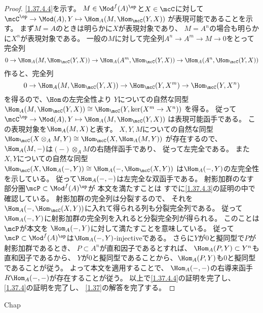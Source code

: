 \documentclass[uplatex,dvipdfmx]{jsarticle}
\begin{document}
\begin{proof}
  \ref{1.37.4.4}を示す。
  \(M\in \Mod^f(A)^{\op}\)と\(X\in \mcC\)に対して
  \(\mcC^{\op}\to \Mod(A), Y\mapsto \Hom_A(M,\Hom_{\mcC}(Y,X))\)
  が表現可能であることを示す。
  まず\(M=A\)のときは明らかに\(X\)が表現対象であり、
  \(M=A^n\)の場合も明らかに\(X^n\)が表現対象である。
  一般の\(M\)に対して完全列\(A^n\to A^m\to M\to 0\)をとって
  完全列
  \[
  0\to \Hom_A(M,\Hom_{\mcC}(Y,X))\to \Hom_A(A^m,\Hom_{\mcC}(Y,X))\to
  \Hom_A(A^n,\Hom_{\mcC}(Y,X))
  \]
  作ると、完全列
  \[
  0\to \Hom_A(M,\Hom_{\mcC}(Y,X)) \to \Hom_{\mcC}(Y,X^m)\to \Hom_{\mcC}(Y,X^n)
  \]
  を得るので、\(\Hom\)の左完全性より
  \(Y\)についての自然な同型
  \(\Hom_A(M,\Hom_{\mcC}(Y,X))\cong \Hom_{\mcC}(Y,\ker(X^m\to X^n))\)
  を得る。
  従って\(\mcC^{\op}\to \Mod(A), Y\mapsto \Hom_A(M,\Hom_{\mcC}(Y,X))\)
  は表現可能函手である。
  この表現対象を\(\Hom_A(M,X)\)と表す。
  \(X,Y,M\)についての自然な同型
  \(\Hom_{\mcC}(X\otimes_AM,Y) \cong \Hom_{\mcC}(X,\Hom_A(M,Y))\)
  が存在するので、
  \(\Hom_A(M,-)\)は\((-)\otimes_AM\)の右随伴函手であり、
  従って左完全である。
  また\(X,Y\)についての自然な同型
  \(\Hom_{\mcC}(X,\Hom_A(-,Y))\cong \Hom_A(-,\Hom_{\mcC}(X,Y))\)
  は\(\Hom_A(-,Y)\)の左完全性を示している。
  従って\(\Hom_A(-,-)\)は左完全な双函手である。
  射影加群のなす部分圏\(\mcP\subset \Mod^f(A)^{\op}\)が
  本文\cite[Definition 1.8.2 (i) (ii)]{kashiwara2002sheaves}を満たすことは
  すでに\ref{1.37.4.3}の証明の中で確認している。
  射影加群の完全列は分裂するので、
  それを\(\Hom_A(-,\Hom_{\mcC}(X,Y))\)に入れて得られる列も分裂完全列である。
  従って\(\Hom_A(-,Y)\)に射影加群の完全列を入れると分裂完全列が得られる。
  このことは\(\mcP\)が本文\cite[Definition 1.8.2 (iii)]{kashiwara2002sheaves}を
  \(\Hom_A(-,Y)\)に対して満たすことを意味している。
  従って\(\mcP\subset \Mod^f(A)^{\op}\)は\(\Hom_A(-,Y)\)-injectiveである。
  さらに\(Y\)が\(0\)と擬同型で\(P\)が射影加群であるとき、
  \(P\subset A^n\)が直和因子であるとすれば、
  \(\Hom_A(P,Y)\subset Y^n\)も直和因子であるから、
  \(Y\)が\(0\)と擬同型であることから、\(\Hom_A(P,Y)\)も\(0\)と擬同型であることが従う。
  よって本文\cite[Corollary 1.10.5]{kashiwara2002sheaves}を適用することで、
  \(\Hom_A(-,-)\)の右導来函手\(R\Hom_A(-,-)\)が存在することが従う。
  以上で\ref{1.37.4.4}の証明を完了し、
  \ref{1.37.4}の証明を完了し、
  \autoref{1.37}の解答を完了する。
\end{proof}



\ifcsname Chap\endcsname\else
\printbibliography
\end{document}
